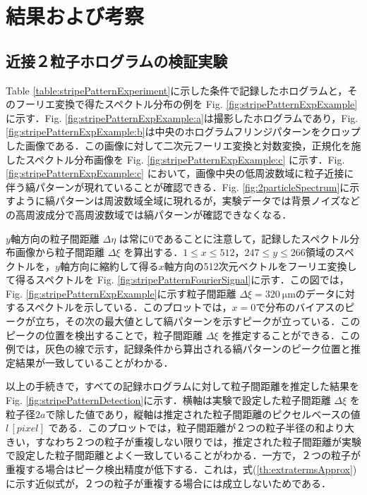 \section{結果および考察}
\subsection{近接２粒子ホログラムの検証実験}
Table \ref{table:stripePatternExperiment}に示した条件で記録したホログラムと，そのフーリエ変換で得たスペクトル分布の例を Fig. \ref{fig:stripePatternExpExample} に示す．Fig. \ref{fig:stripePatternExpExample:a}は撮影したホログラムであり，Fig. \ref{fig:stripePatternExpExample:b}は中央のホログラムフリンジパターンをクロップした画像である．この画像に対して二次元フーリエ変換と対数変換，正規化を施したスペクトル分布画像を Fig. \ref{fig:stripePatternExpExample:c} に示す．Fig. \ref{fig:stripePatternExpExample:c} において，画像中央の低周波数域に粒子近接に伴う縞パターンが現れていることが確認できる．Fig. \ref{fig:2particleSpectrum}に示すように縞パターンは周波数域全域に現れるが，実験データでは背景ノイズなどの高周波成分で高周波数域では縞パターンが確認できなくなる．

$y$軸方向の粒子間距離 $\Delta \eta$ は常に0であることに注意して，記録したスペクトル分布画像から粒子間距離 $\Delta \xi$ を算出する．$1 \leq x \leq 512$，$247 \leq y \leq 266$領域のスペクトルを，$y$軸方向に縮約して得る$x$軸方向の512次元ベクトルをフーリエ変換して得るスペクトルを Fig. \ref{fig:stripePatternFourierSignal}に示す．この図では，Fig. \ref{fig:stripePatternExpExample}に示す粒子間距離 $\Delta \xi = \SI{320}{\um}$のデータに対するスペクトルを示している．このプロットでは，$x=0$で分布のバイアスのピークが立ち，その次の最大値として縞パターンを示すピークが立っている．このピークの位置を検出することで，粒子間距離 $\Delta \xi$ を推定することができる．この例では，灰色の線で示す，記録条件から算出される縞パターンのピーク位置と推定結果が一致していることがわかる．

以上の手続きで，すべての記録ホログラムに対して粒子間距離を推定した結果を Fig. \ref{fig:stripePatternDetection}に示す．横軸は実験で設定した粒子間距離 $\Delta \xi$ を粒子径$2a$で除した値であり，縦軸は推定された粒子間距離のピクセルベースの値 $l\, \si{[pixel]}$ である．このプロットでは，粒子間距離が２つの粒子半径の和より大きい，すなわち２つの粒子が重複しない限りでは，推定された粒子間距離が実験で設定した粒子間距離とよく一致していることがわかる．一方で，２つの粒子が重複する場合はピーク検出精度が低下する．これは，式(\ref{th:extratermsApprox})に示す近似式が，２つの粒子が重複する場合には成立しないためである．

